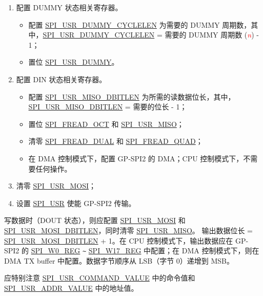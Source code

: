 \documentclass[main\_\_CN.tex]{subfiles}
\begin{document}
\begin{enumerate}
    \item 配置 DUMMY 状态相关寄存器。
        \begin{itemize}
            \item 配置 \hyperref[fielddesc:SPIUSRDUMMYCYCLELEN]{SPI\_USR\_DUMMY\_CYCLELEN} 为需要的 DUMMY 周期数，其中，\hyperref[fielddesc:SPIUSRDUMMYCYCLELEN]{SPI\_USR\_DUMMY\_CYCLELEN} = 需要的 DUMMY 周期数 (\textcolor{red}{\it{n}}) - 1；
            \item 置位 \hyperref[fielddesc:SPIUSRDUMMY]{SPI\_USR\_DUMMY}。
        \end{itemize}

    \item 配置 DIN 状态相关寄存器。
        \begin{itemize}
            \item 配置 \hyperref[fielddesc:SPIUSRMISODBITLEN]{SPI\_USR\_MISO\_DBITLEN} 为所需的读数据位长，其中，\hyperref[fielddesc:SPIUSRMISODBITLEN]{SPI\_USR\_MISO\_DBITLEN} = 需要的位长 - 1；
            \item 置位 \hyperref[fielddesc:SPIFREADOCT]{SPI\_FREAD\_OCT} 和 \hyperref[fielddesc:SPIUSRMISO]{SPI\_USR\_MISO}；
            \item 清零 \hyperref[fielddesc:SPIFREADDUAL]{SPI\_FREAD\_DUAL} 和 \hyperref[fielddesc:SPIFREADQUAD]{SPI\_FREAD\_QUAD}；
            \item 在 DMA 控制模式下，配置 GP-SPI2 的 DMA；CPU 控制模式下，不需要任何操作。
        \end{itemize}

    \item 清零 \hyperref[fielddesc:SPIUSRMOSI]{SPI\_USR\_MOSI}；

    \item 设置 \hyperref[fielddesc:SPIUSR]{SPI\_USR} 使能 GP-SPI2 传输。
\end{enumerate}

写数据时（DOUT 状态），则应配置 \hyperref[fielddesc:SPIUSRMOSI]{SPI\_USR\_MOSI} 和 \hyperref[fielddesc:SPIUSRMOSIDBITLEN]{SPI\_USR\_MOSI\_DBITLEN}，同时清零 \hyperref[fielddesc:SPIUSRMISO]{SPI\_USR\_MISO}。
输出数据位长 = \hyperref[fielddesc:SPIUSRMOSIDBITLEN]{SPI\_USR\_MOSI\_DBITLEN} + 1。在 CPU 控制模式下，输出数据应在 GP-SPI2 的 \hyperref[regdesc:SPIW0REG]{SPI\_W0\_REG} \verb+~+ \hyperref[regdesc:SPIW17REG]{SPI\_W17\_REG} 中配置；在 DMA 控制模式下，则在 DMA TX buffer 中配置。数据字节顺序从 LSB（字节 0）递增到 MSB。

应特别注意 \hyperref[fielddesc:SPIUSRCOMMANDVALUE]{SPI\_USR\_COMMAND\_VALUE} 中的命令值和 \hyperref[fielddesc:SPIUSRADDRVALUE]{SPI\_USR\_ADDR\_VALUE} 中的地址值。
\end{document}
